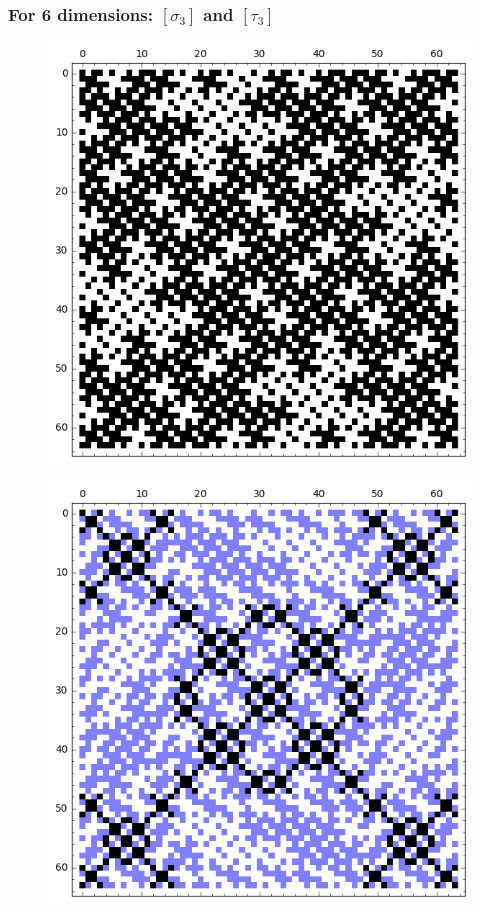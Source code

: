 \documentclass[pdf,sprung,slideColor,nocolorBG]{beamer}
\newenvironment{colortheme}[1]{
\def\ProvidesPackageRCS $##1${\relax}
\renewcommand{\ProcessOptions}{\relax}
\makeatletter

\makeatother
}{}
\begin{document}
\begin{colortheme}{jubata}
\begin{frame}
\begin{figure}
\begin{minipage}{.48\textwidth}
  \label{fig:tau_2_bent_cayley_graph_index_matrix}
\end{minipage}
\end{figure}
\end{frame}

\begin{frame}
\frametitle{For 6 dimensions: $[\sigma_3]$ and $[\tau_3]$}
\begin{figure}
\centering
\begin{minipage}{.48\textwidth}
  \centering
  \includegraphics[width=.9\linewidth]{../matrix_plot/sigma_3_bent_cayley_graph_index_matrix.png}
  \label{fig:sigma_3_bent_cayley_graph_index_matrix}
\end{minipage}%
\begin{minipage}{.48\textwidth}
  \centering
  \includegraphics[width=.9\linewidth]{../matrix_plot/tau_3_bent_cayley_graph_index_matrix.png}

\end{minipage}
\end{figure}
\end{frame}
\end{colortheme}
\end{document}
